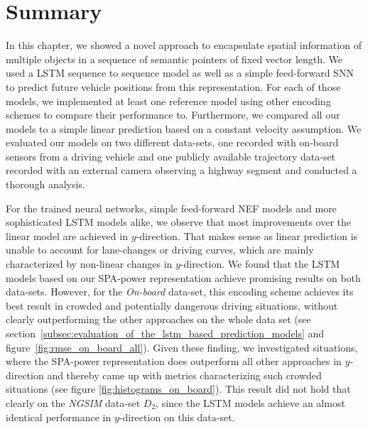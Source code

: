 \section{Summary}%
\label{sec:summary_behavior_prediction}

In this chapter, we showed a novel approach to encapsulate spatial information of multiple objects in a sequence of semantic pointers of fixed vector length.
We used a \ac{LSTM} sequence to sequence model as well as a simple feed-forward \acl{SNN} to predict future vehicle positions from this representation.
For each of those models, we implemented at least one reference model using other encoding schemes to compare their performance to.
Furthermore, we compared all our models to a simple linear prediction based on a constant velocity assumption.
We evaluated our models on two different data-sets, one recorded with on-board sensors from a driving vehicle and one publicly available trajectory data-set recorded with an external camera observing a highway segment and conducted a thorough analysis.

For the trained neural networks, simple feed-forward \ac{NEF} models and more sophisticated \ac{LSTM} models alike, we observe that most improvements over the linear model are achieved in $y$-direction.
That makes sense as linear prediction is unable to account for lane-changes or driving curves, which are mainly characterized by non-linear changes in $y$-direction.
We found that the \ac{LSTM} models based on our \ac{SPA}-power representation achieve promising results on both data-sets.
However, for the \emph{On-board} data-set, this encoding scheme achieves its best result in crowded and potentially dangerous driving situations, without clearly outperforming the other approaches on the whole data set (see section~\ref{subsec:evaluation_of_the_lstm_based_prediction_models} and figure~\ref{fig:rmse_on_board_all}).
Given these finding, we investigated situations, where the \ac{SPA}-power representation does outperform all other approaches in $y$-direction and thereby came up with metrics characterizing such crowded situations (see figure \ref{fig:histograms_on_board}).
This result did not hold that clearly on the \emph{\ac{NGSIM}} data-set $D_2$, since the \ac{LSTM} models achieve an almost identical performance in $y$-direction on this data-set.

